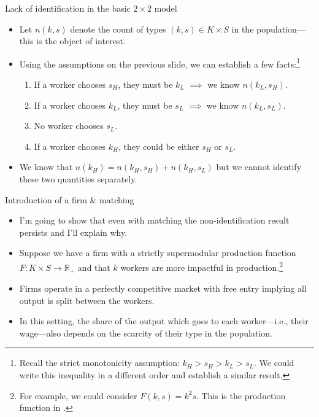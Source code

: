 \documentclass[aspectratio=169]{beamer}
\begin{document}
\begin{frame}{Lack of identification in the basic $2\times 2$ model}
	\begin{itemize}
		\item Let $n(k,s)$ denote the count of types $(k,s)\in K\times S$ in the population---this is the object of interest.
		\smallskip
		\item Using the assumptions on the previous slide, we can establish a few facts:\footnote{Recall the strict monotonicity assumption: $k_H > s_H > k_L > s_L$. We could write this inequality in a different order and establish a similar result.}
		\begin{enumerate}
			\item If a worker chooses $s_H$, they must be $k_L$ $\implies$ we know $n(k_L,s_H)$.
			\item If a worker chooses $k_L$, they must be $s_L$ $\implies$ we know $n(k_L,s_L)$.
			\item No worker chooses $s_L$.
			\item If a worker chooses $k_H$, they could be either $s_H$ or $s_L$.
		\end{enumerate}
		\smallskip
		\item We know that $n(k_H) = n(k_H,s_H) + n(k_H,s_L)$ but we cannot identify these two quantities separately.
	\end{itemize}
\end{frame}


\begin{frame}{Introduction of a firm \& matching}
	\begin{itemize}
		\item I'm going to show that even with matching the non-identification result persists and I'll explain why.
		\bigskip
		\item Suppose we have a firm with a strictly supermodular production function $F:K\times S \to \mathbb{R}_+$ and that $k$ workers are more impactful in production.\footnote{For example, we could consider $F(k,s)=k^2s$. This is the production function in \citet{kremer1996wage}.}
		\bigskip
		\item Firms operate in a perfectly competitive market with free entry implying all output is split between the workers.
		\bigskip
		\item In this setting, the share of the output which goes to each worker---i.e., their wage---also depends on the scarcity of their type in the population.
	\end{itemize}
\end{frame}
\end{document}
